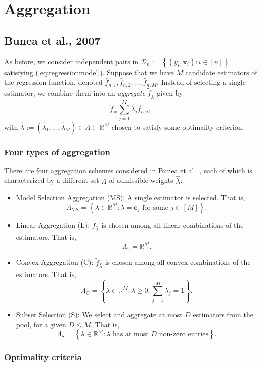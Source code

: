 \documentclass[12pt, letter paper]{article}
\newcommand{\1}{\mathmybb{1}}
\newcommand{\R}{\mathbb{R}}
\newcommand{\0}{\emptyset}
\newcommand{\paren}[1]{\left(#1 \right)}
\newcommand{\set}[1]{\left\{ #1 \right\}}
\newcommand{\data}{\mathcal{D}_{n}}
\newcommand{\x}{\boldsymbol{x}}
\newcommand{\fhat}[2]{\hat{f}_{#1, #2}}
\newcommand{\ftilde}[1]{\tilde{f}_{#1}}
\newcommand{\lambdahat}[1]{\hat{\lambda}_{#1}}
\begin{document}
\section{Aggregation}
\subsection{Bunea et al., 2007}

As before, we consider independent pairs in \(\data := \set{\paren{y_{i}, \x_{i}}:i\in [n]}\) satisfying (\ref{eq:regressionmodel}). Suppose that we have \(M\) candidate estimators of the regression function, denoted \(\fhat{n}{1}, \fhat{n}{2}, \ldots, \fhat{n}{M}\). Instead of selecting a single estimator, we combine them into an \emph{aggregate} \(\ftilde{\lambdahat{}}\) given by
\[\ftilde = \sum_{j=1}^{M}\lambdahat{j} \fhat{n}{j},\]
with \(\lambdahat{}:=\paren{\lambdahat{1}, \ldots, \lambdahat{M}}\in \Lambda\subset\R^{M}\) chosen to satisfy some optimality criterion.

\subsubsection{Four types of aggregation}

There are four aggregation schemes considered in Bunea et al.~\cite{bunea_2007}, each of which is characterized by a different set \(\Lambda\) of admissible weights \(\lambdahat{}\):
\begin{itemize}
    \item Model Selection Aggregation (MS): A single estimator is selected. That is,\[\Lambda_{\mathrm{MS}} = \set{\lambda\in\R^{M}:\lambda = \boldsymbol{e}_{j}\text{ for some }j\in[M]}.\]
    \item Linear Aggregation (L): \(\ftilde{\lambdahat{}}\) is chosen among all linear combinations of the estimators. That is, \[\Lambda_{\mathrm{L}} = \R^{M}.\]
    \item Convex Aggregation (C): \(\ftilde{\lambdahat{}}\) is chosen among all convex combinations of the estimators. That is, \[\Lambda_{\mathrm{C}} = \set{\lambda\in\R^{M}:\lambda\geq 0, \sum_{j=1}^{M}\lambda_{j} = 1}.\]
    \item Subset Selection (S): We select and aggregate at most \(D\) estimators from the pool, for a given \(D\leq M\). That is, \[\Lambda_{\mathrm{S}} = \set{\lambda\in\R^{M}:\lambda\text{ has at most \(D\) non-zero entries}}.\]
\end{itemize}

\subsubsection{Optimality criteria}
\end{document}
